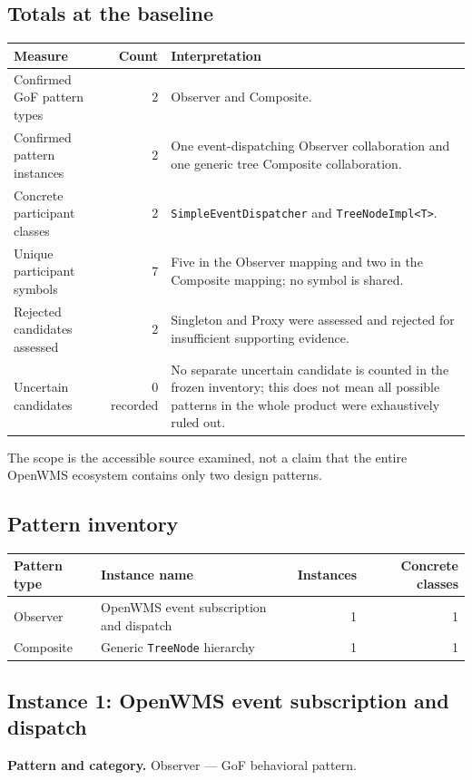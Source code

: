 \documentclass[11pt,a4paper]{article}
\newcommand{\code}[1]{\nolinkurl{#1}}
\begin{document}
\subsection{Totals at the baseline}
\begin{tabularx}{\linewidth}{@{}l r Y@{}}
\toprule
Measure & Count & Interpretation\\
\midrule
Confirmed GoF pattern types & 2 & Observer and Composite.\\
Confirmed pattern instances & 2 & One event-dispatching Observer collaboration and one generic tree Composite collaboration.\\
Concrete participant classes & 2 & \code{SimpleEventDispatcher} and \code{TreeNodeImpl<T>}.\\
Unique participant symbols & 7 & Five in the Observer mapping and two in the Composite mapping; no symbol is shared.\\
Rejected candidates assessed & 2 & Singleton and Proxy were assessed and rejected for insufficient supporting evidence.\\
Uncertain candidates & 0 recorded & No separate uncertain candidate is counted in the frozen inventory; this does not mean all possible patterns in the whole product were exhaustively ruled out.\\
\bottomrule
\end{tabularx}

The scope is the accessible source examined, not a claim that the entire OpenWMS ecosystem contains only two design patterns.

\subsection{Pattern inventory}
\begin{tabularx}{\linewidth}{@{}lYrr@{}}
\toprule
Pattern type & Instance name & Instances & Concrete classes\\
\midrule
Observer & OpenWMS event subscription and dispatch & 1 & 1\\
Composite & Generic \code{TreeNode} hierarchy & 1 & 1\\
\bottomrule
\end{tabularx}

\subsection{Instance 1: OpenWMS event subscription and dispatch}
\textbf{Pattern and category.} Observer --- GoF behavioral pattern.
\end{document}
